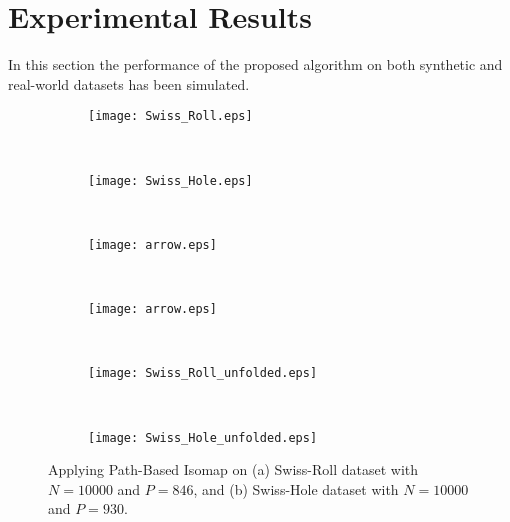 \documentclass[10pt,journal,cspaper,compsoc]{IEEEtran}
\let\MYoriglatexcaption\caption
\renewcommand{\caption}[2][\relax]{\MYoriglatexcaption[#2]{#2}}
\begin{document}
\section{Experimental Results}
In this section the performance of the proposed algorithm on both synthetic and real-world datasets has been simulated.

\begin{figure}[t]
\centering
        \begin{subfigure}[b]{0.23\textwidth}
                \texttt{[image: Swiss\_Roll.eps]}
\end{subfigure}~
		\begin{subfigure}[b]{0.23\textwidth}
    		\texttt{[image: Swiss\_Hole.eps]}
\end{subfigure}\\
        \begin{subfigure}[b]{0.23\textwidth}
        \begin{center}
                \texttt{[image: arrow.eps]}
\end{center}
        \end{subfigure}~
        \begin{subfigure}[b]{0.23\textwidth}
        \begin{center}
                \texttt{[image: arrow.eps]}
\end{center}
	    \end{subfigure}\\
\begin{subfigure}[b]{0.23\textwidth}
                \texttt{[image: Swiss\_Roll\_unfolded.eps]}
                \caption{}
        \end{subfigure}~
        \begin{subfigure}[b]{0.23\textwidth}
                \texttt{[image: Swiss\_Hole\_unfolded.eps]}
                \caption{}
	    \end{subfigure}
        \vspace{2mm}
        \caption{{\small Applying Path-Based Isomap on (a) Swiss-Roll dataset with $N=10000$ and $P=846$, and (b) Swiss-Hole dataset with $N=10000$ and $P=930$.}}
        \label{fig_8_1}
\end{figure}
\end{document}
